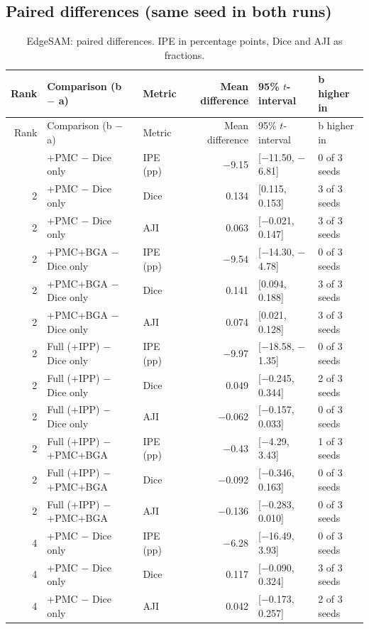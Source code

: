 \documentclass[10pt]{article}
\begin{document}
\begin{landscape}
\section{Paired differences (same seed in both runs)}
{\footnotesize
\begin{longtable}{r l l r l l}
\caption{EdgeSAM: paired differences. IPE in percentage points, Dice and AJI as fractions.}\label{tab:pair_edge_sam}\\
\toprule
Rank & Comparison (b $-$ a) & Metric & Mean difference & 95\% $t$-interval & b higher in \\
\midrule
\endfirsthead
\toprule
Rank & Comparison (b $-$ a) & Metric & Mean difference & 95\% $t$-interval & b higher in \\
\midrule
\endhead
\bottomrule
\endfoot
2 & +PMC $-$ Dice only & IPE (pp) & $-$9.15 & [$-$11.50, $-$6.81] & 0 of 3 seeds \\
2 & +PMC $-$ Dice only & Dice & 0.134 & [0.115, 0.153] & 3 of 3 seeds \\
2 & +PMC $-$ Dice only & AJI & 0.063 & [$-$0.021, 0.147] & 3 of 3 seeds \\
2 & +PMC+BGA $-$ Dice only & IPE (pp) & $-$9.54 & [$-$14.30, $-$4.78] & 0 of 3 seeds \\
2 & +PMC+BGA $-$ Dice only & Dice & 0.141 & [0.094, 0.188] & 3 of 3 seeds \\
2 & +PMC+BGA $-$ Dice only & AJI & 0.074 & [0.021, 0.128] & 3 of 3 seeds \\
2 & Full (+IPP) $-$ Dice only & IPE (pp) & $-$9.97 & [$-$18.58, $-$1.35] & 0 of 3 seeds \\
2 & Full (+IPP) $-$ Dice only & Dice & 0.049 & [$-$0.245, 0.344] & 2 of 3 seeds \\
2 & Full (+IPP) $-$ Dice only & AJI & $-$0.062 & [$-$0.157, 0.033] & 0 of 3 seeds \\
2 & Full (+IPP) $-$ +PMC+BGA & IPE (pp) & $-$0.43 & [$-$4.29, 3.43] & 1 of 3 seeds \\
2 & Full (+IPP) $-$ +PMC+BGA & Dice & $-$0.092 & [$-$0.346, 0.163] & 0 of 3 seeds \\
2 & Full (+IPP) $-$ +PMC+BGA & AJI & $-$0.136 & [$-$0.283, 0.010] & 0 of 3 seeds \\
4 & +PMC $-$ Dice only & IPE (pp) & $-$6.28 & [$-$16.49, 3.93] & 0 of 3 seeds \\
4 & +PMC $-$ Dice only & Dice & 0.117 & [$-$0.090, 0.324] & 3 of 3 seeds \\
4 & +PMC $-$ Dice only & AJI & 0.042 & [$-$0.173, 0.257] & 2 of 3 seeds \\

\end{longtable}}
\end{landscape}
\end{document}
